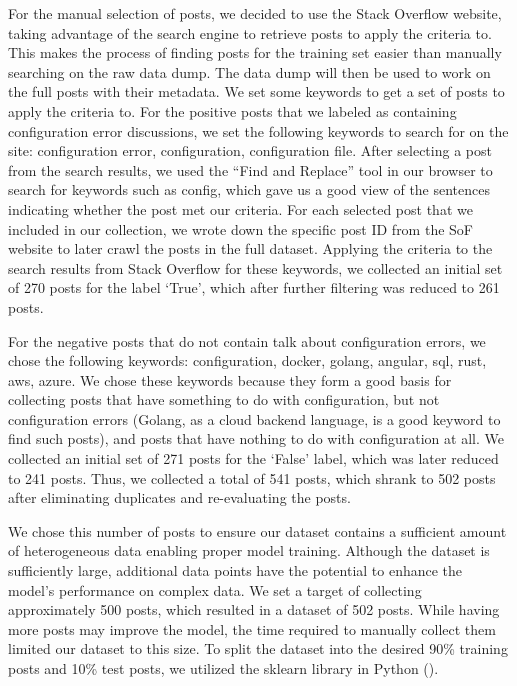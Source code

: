\documentclass[english,bachelor]{swsLeipzig}
\begin{document}
For the manual selection of posts, we decided to use the Stack Overflow website, taking advantage of the search engine 
to retrieve posts to apply the criteria to. This makes the process of finding posts for the training set easier than manually searching on the raw data dump. The data dump will then be used to work on the full posts with their metadata. We set some keywords to get a set of posts to apply the criteria to. For the positive posts that we labeled as containing configuration error discussions, we set the following keywords to search for on the site: configuration error, configuration, configuration file. After selecting a post from the search results, we used the ``Find and Replace'' tool in our browser to search for keywords such as config, which gave us a good view of the sentences indicating whether the post met our criteria. For each selected post that we included in our collection, we wrote down the specific post ID from the SoF website to later crawl the posts in the full dataset. Applying the criteria to the search results from Stack Overflow for these keywords, we collected an initial set of 270 posts for the label `True', which after further filtering was reduced to 261 posts.

For the negative posts that do not contain talk about configuration errors, we chose the following keywords: 
configuration, docker, golang, angular, sql, rust, aws, azure. We chose these keywords because they form a good basis for collecting posts that have something to do with configuration, but not configuration errors (Golang, as a cloud backend language, is a good keyword to find such posts), and posts that have nothing to do with configuration at all. We collected an initial set of 271 posts for the `False' label, which was later reduced to 241 posts. Thus, we collected a total of 541 posts, which shrank to 502 posts after eliminating duplicates and re-evaluating the posts.

We chose this number of posts to ensure our dataset contains a sufficient amount of heterogeneous data enabling proper model training. Although the dataset is sufficiently large, additional data points have the potential to enhance the model's performance on complex data. We set a target of collecting approximately 500 posts, which resulted in a dataset of 502 posts. While having more posts may improve the model, the time required to manually collect them limited our dataset to this size. To split the dataset into the desired 90\% training posts and 10\% test posts, we utilized the sklearn library in Python (\citeauthor{scikitlearn}).
\end{document}
